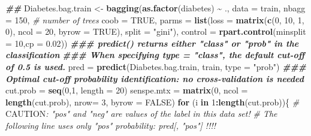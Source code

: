 \documentclass[
]{book}
\newenvironment{Shaded}{\begin{snugshade}}{\end{snugshade}}
\newcommand{\AlertTok}[1]{\textcolor[rgb]{0.94,0.16,0.16}{#1}}
\newcommand{\AttributeTok}[1]{\textcolor[rgb]{0.13,0.29,0.53}{#1}}
\newcommand{\CommentTok}[1]{\textcolor[rgb]{0.56,0.35,0.01}{\textit{#1}}}
\newcommand{\ConstantTok}[1]{\textcolor[rgb]{0.56,0.35,0.01}{#1}}
\newcommand{\ControlFlowTok}[1]{\textcolor[rgb]{0.13,0.29,0.53}{\textbf{#1}}}
\newcommand{\DecValTok}[1]{\textcolor[rgb]{0.00,0.00,0.81}{#1}}
\newcommand{\DocumentationTok}[1]{\textcolor[rgb]{0.56,0.35,0.01}{\textbf{\textit{#1}}}}
\newcommand{\FloatTok}[1]{\textcolor[rgb]{0.00,0.00,0.81}{#1}}
\newcommand{\FunctionTok}[1]{\textcolor[rgb]{0.13,0.29,0.53}{\textbf{#1}}}
\newcommand{\NormalTok}[1]{#1}
\newcommand{\OtherTok}[1]{\textcolor[rgb]{0.56,0.35,0.01}{#1}}
\newcommand{\SpecialCharTok}[1]{\textcolor[rgb]{0.81,0.36,0.00}{\textbf{#1}}}
\newcommand{\StringTok}[1]{\textcolor[rgb]{0.31,0.60,0.02}{#1}}
\begin{document}
\begin{Shaded}
\begin{Highlighting}[]
\DocumentationTok{\#\#}
\NormalTok{Diabetes.bag.train }\OtherTok{\textless{}{-}} \FunctionTok{bagging}\NormalTok{(}\FunctionTok{as.factor}\NormalTok{(diabetes) }\SpecialCharTok{\textasciitilde{}}\NormalTok{ ., }
                              \AttributeTok{data =}\NormalTok{ train, }
                              \AttributeTok{nbagg =} \DecValTok{150}\NormalTok{,    }\CommentTok{\# number of trees}
                              \AttributeTok{coob =} \ConstantTok{TRUE}\NormalTok{, }
                              \AttributeTok{parms =} \FunctionTok{list}\NormalTok{(}\AttributeTok{loss =} \FunctionTok{matrix}\NormalTok{(}\FunctionTok{c}\NormalTok{(}\DecValTok{0}\NormalTok{, }\DecValTok{10}\NormalTok{, }\DecValTok{1}\NormalTok{, }\DecValTok{0}\NormalTok{), }
                                                          \AttributeTok{ncol =} \DecValTok{20}\NormalTok{, }
                                                          \AttributeTok{byrow =} \ConstantTok{TRUE}\NormalTok{),   }
                                                          \AttributeTok{split =} \StringTok{"gini"}\NormalTok{),  }
                              \AttributeTok{control =} \FunctionTok{rpart.control}\NormalTok{(}\AttributeTok{minsplit =} \DecValTok{10}\NormalTok{,}\AttributeTok{cp =} \FloatTok{0.02}\NormalTok{))}
\DocumentationTok{\#\#\# predict() returns either "class" or "prob" in the classification}
\DocumentationTok{\#\#\# When specifying type = "class", the default cut{-}off of 0.5 is used.}
\NormalTok{pred }\OtherTok{=} \FunctionTok{predict}\NormalTok{(Diabetes.bag.train, train, }\AttributeTok{type =} \StringTok{"prob"}\NormalTok{)}
\DocumentationTok{\#\#\# Optimal cut{-}off probability identification: no cross{-}validation is needed}
\NormalTok{cut.prob }\OtherTok{=} \FunctionTok{seq}\NormalTok{(}\DecValTok{0}\NormalTok{,}\DecValTok{1}\NormalTok{, }\AttributeTok{length =} \DecValTok{20}\NormalTok{)}
\NormalTok{  senspe.mtx }\OtherTok{=} \FunctionTok{matrix}\NormalTok{(}\DecValTok{0}\NormalTok{, }\AttributeTok{ncol =} \FunctionTok{length}\NormalTok{(cut.prob), }\AttributeTok{nrow=} \DecValTok{3}\NormalTok{, }\AttributeTok{byrow =} \ConstantTok{FALSE}\NormalTok{)}
  \ControlFlowTok{for}\NormalTok{ (i }\ControlFlowTok{in} \DecValTok{1}\SpecialCharTok{:}\FunctionTok{length}\NormalTok{(cut.prob))\{}
  \CommentTok{\# }\AlertTok{CAUTION}\CommentTok{: "pos" and "neg" are values of the label in this data set!}
  \CommentTok{\# The following line uses only "pos" probability: pred[, "pos"] !!!!}

\end{Highlighting}
\end{Shaded}
\end{document}
